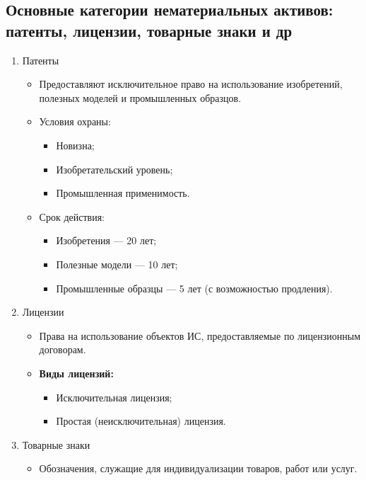 \pagebreak
\subsection{Основные категории нематериальных активов: патенты, лицензии, товарные знаки и др}

\begin{enumerate}
    \item Патенты
        \begin{itemize}
            \item Предоставляют исключительное право на использование изобретений, полезных моделей и промышленных образцов.
            \item Условия охраны:
            \begin{itemize}
                \item Новизна;
                \item Изобретательский уровень;
                \item Промышленная применимость.
            \end{itemize}
            \item Срок действия:
            \begin{itemize}
                \item Изобретения — 20 лет;
                \item Полезные модели — 10 лет;
                \item Промышленные образцы — 5 лет (с возможностью продления).
            \end{itemize}
        \end{itemize}
    \item Лицензии
        \begin{itemize}
            \item Права на использование объектов ИС, предоставляемые по лицензионным договорам.
            \item \textbf{Виды лицензий:}
            \begin{itemize}
                \item Исключительная лицензия;
                \item Простая (неисключительная) лицензия.
            \end{itemize}
        \end{itemize}
    \item Товарные знаки
        \begin{itemize}
            \item Обозначения, служащие для индивидуализации товаров, работ или услуг.

\end{itemize}
\end{enumerate}
